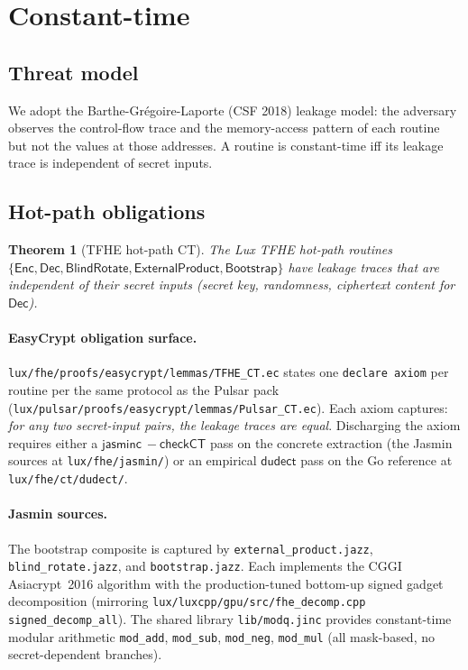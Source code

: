 \documentclass[11pt,a4paper]{article}
\newtheorem{theorem}{Theorem}[section]
\begin{document}
\section{Constant-time}\label{sec:ct}

\subsection{Threat model}

We adopt the Barthe-Gr\'egoire-Laporte (CSF 2018) leakage model:
the adversary observes the control-flow trace and the
memory-access pattern of each routine but not the values at those
addresses. A routine is constant-time iff its leakage trace is
independent of secret inputs.

\subsection{Hot-path obligations}

\begin{theorem}[TFHE hot-path CT]\label{thm:tfhe-ct}
The Lux TFHE hot-path routines $\{\mathsf{Enc}, \mathsf{Dec},
\mathsf{BlindRotate}, \mathsf{ExternalProduct}, \mathsf{Bootstrap}\}$
have leakage traces that are independent of their secret inputs
(secret key, randomness, ciphertext content for $\mathsf{Dec}$).
\end{theorem}

\paragraph{EasyCrypt obligation surface.}
\texttt{lux/fhe/proofs/easycrypt/lemmas/TFHE\_CT.ec} states one
\texttt{declare axiom} per routine per the same protocol as the
Pulsar pack
(\texttt{lux/pulsar/proofs/easycrypt/lemmas/Pulsar\_CT.ec}). Each
axiom captures: \emph{for any two secret-input pairs, the leakage
traces are equal}. Discharging the axiom requires either a
$\mathsf{jasminc\ -checkCT}$ pass on the concrete extraction (the
Jasmin sources at \texttt{lux/fhe/jasmin/}) or an empirical
$\mathsf{dudect}$ pass on the Go reference at
\texttt{lux/fhe/ct/dudect/}.

\paragraph{Jasmin sources.} The bootstrap composite is captured by
\texttt{external\_product.jazz},
\texttt{blind\_rotate.jazz}, and
\texttt{bootstrap.jazz}. Each implements the CGGI Asiacrypt~2016
algorithm with the production-tuned bottom-up signed gadget
decomposition (mirroring
\texttt{lux/luxcpp/gpu/src/fhe\_decomp.cpp}
\texttt{signed\_decomp\_all}). The shared library
\texttt{lib/modq.jinc} provides constant-time modular arithmetic
\texttt{mod\_add}, \texttt{mod\_sub}, \texttt{mod\_neg},
\texttt{mod\_mul} (all mask-based, no secret-dependent branches).
\end{document}
